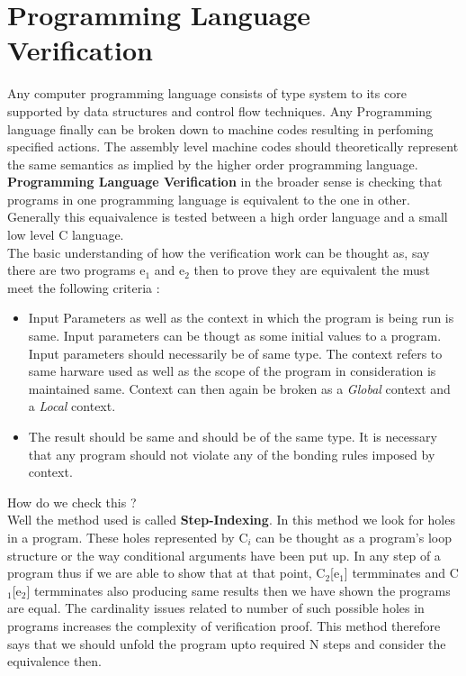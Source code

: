\chapter{Programming Language Verification }
\graphicspath{ {./images/} }

Any computer programming language consists of type system to its core supported by data structures and control flow techniques. Any Programming language finally can be broken down to machine codes resulting in perfoming specified actions. The assembly level machine codes should theoretically represent the same semantics as implied by the higher order programming language. \textbf{Programming Language Verification} in the broader sense is checking that programs in one programming language is equivalent to the one in other. Generally this equaivalence is tested between a high order	language and a small low level C language. \\

The basic understanding of how the verification work can be thought as, say there are two programs e$_1$ and e$_2$ then to prove they are equivalent the must meet the following criteria :

\begin{itemize}

\item{
	Input Parameters as well as the context in which the program is being run is same. Input parameters can be thougt as some initial values to a program. Input parameters should necessarily be of same type. The context refers to same harware used as well as the scope of the program in consideration is maintained same. Context can then again be broken as a \textit{Global} context and a \textit{Local} context. 
}

\item{
	The result should be same and should be of the same type. It is necessary that any program should not violate any of the bonding rules imposed by context.
}

\end{itemize}    

How do we check this ?\\

Well the method used is called \textbf{Step-Indexing}\cite{step_indexing}. In this method we look for holes in a program. These holes represented by C$_i$ can be thought as a program's loop structure or the way conditional arguments have been put up. In any step of a program thus if we are able to show that at that point, C$_2$[e$_1$] termminates and C$_1$[e$_2$] termminates also producing same results then we have shown the programs are equal. The cardinality issues related to number of such possible holes in programs increases the complexity of verification proof. This method therefore says that we should unfold the program upto required N steps and consider the equivalence then.\\

